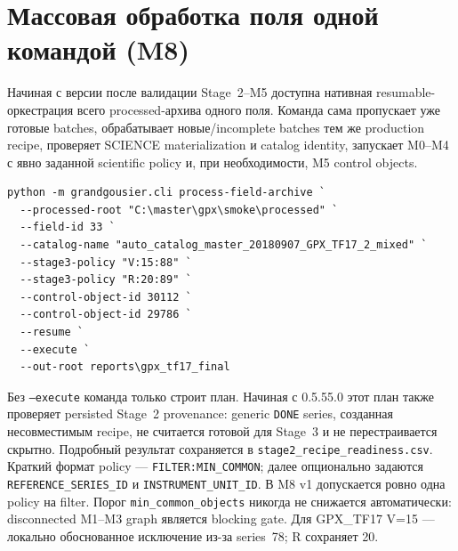 \section{Массовая обработка поля одной командой (M8)}

Начиная с версии \manualversion{} после валидации Stage~2--M5 доступна нативная resumable-оркестрация всего processed-архива одного поля. Команда сама пропускает уже готовые batches, обрабатывает новые/incomplete batches тем же production recipe, проверяет SCIENCE materialization и catalog identity, запускает M0--M4 с явно заданной scientific policy и, при необходимости, M5 control objects.

\begin{lstlisting}
python -m grandgousier.cli process-field-archive `
  --processed-root "C:\master\gpx\smoke\processed" `
  --field-id 33 `
  --catalog-name "auto_catalog_master_20180907_GPX_TF17_2_mixed" `
  --stage3-policy "V:15:88" `
  --stage3-policy "R:20:89" `
  --control-object-id 30112 `
  --control-object-id 29786 `
  --resume `
  --execute `
  --out-root reports\gpx_tf17_final
\end{lstlisting}

Без \texttt{--execute} команда только строит план. Начиная с 0.5.55.0 этот план также проверяет persisted Stage~2 provenance: generic \texttt{DONE} series, созданная несовместимым recipe, не считается готовой для Stage~3 и не перестраивается скрытно. Подробный результат сохраняется в \texttt{stage2\_recipe\_readiness.csv}. Краткий формат policy --- \texttt{FILTER:MIN\_COMMON}; далее опционально задаются \texttt{REFERENCE\_SERIES\_ID} и \texttt{INSTRUMENT\_UNIT\_ID}. В M8 v1 допускается ровно одна policy на filter. Порог \texttt{min\_common\_objects} никогда не снижается автоматически: disconnected M1--M3 graph является blocking gate. Для GPX\_TF17 V=15 --- локально обоснованное исключение из-за series~78; R сохраняет 20.

